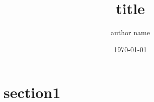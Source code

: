\documentclass[10px]{jsarticle}
\begin{document}
\title{title}
\date{\today}
\author{author name}
\maketitle

\section{section1}
\end{document}
